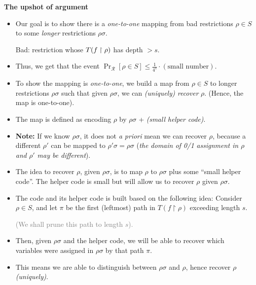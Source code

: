 \begin{tcolorbox}[colframe=white, colback=blue!4, boxrule=0mm, sharp corners]
\textbf{The upshot of argument}
\begin{itemize}
    \item Our goal is to show there is a \emph{one-to-one} mapping from bad restrictions \( \rho \in S \) to some \emph{longer} restrictions \( \rho\sigma \). 

    Bad: restriction whose \( T(f\upharpoonright\rho) \) has depth \( > s \). 
    \item Thus, we get that the event \( \Pr_{\mathcal{R}}[ \rho \in S ] \leq \frac{1}{4^s} \cdot (\text{small number}) \).
    
    \item To show the mapping is \emph{one-to-one}, we build a map from \( \rho \in S \) to longer restrictions \( \rho\sigma \) such that given \( \rho\sigma \), we can \emph{(uniquely) recover} \( \rho \). (Hence, the map is one-to-one).
    
    \item The map is defined as encoding \( \rho \) by \( \rho\sigma \) + \emph{(small helper code)}.

    \item \textbf{Note:} If we know \( \rho\sigma \), it does not \emph{a priori} mean we can recover \( \rho \), because a different \( \rho' \) can be mapped to \( \rho'\sigma = \rho\sigma \) (\emph{the domain of 0/1 assignment in \( \rho \) and \( \rho' \) may be different}).
    
    \item The idea to recover \( \rho \), given \( \rho\sigma \), is to map \( \rho \) to \( \rho\sigma \) plus some ``small helper code''. The helper code is small but will allow us to recover \( \rho \) given \( \rho\sigma \).

    \item The code and its helper code is built based on the following idea: Consider \( \rho \in S \), and let \( \pi \) be the first (leftmost) path in \( T(f \restriction \rho) \) exceeding length \( s \). 
    
    \textcolor{gray}{(We shall prune this path to length \( s \)).}
\end{itemize}

\begin{itemize}
    \item Then, given \( \rho\sigma \) and the helper code, we will be able to recover which variables were assigned in \( \rho\sigma \) by that path \( \pi \).
    
    \item This means we are able to distinguish between \( \rho\sigma \) and \( \rho \), hence recover \( \rho \) \emph{(uniquely)}.
\end{itemize}
\end{tcolorbox}

